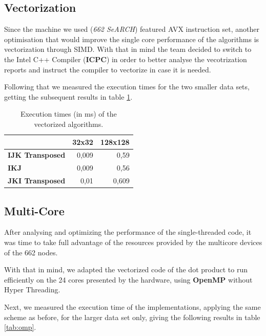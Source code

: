 \documentclass[twoside,twocolumn]{article}
\begin{document}
\subsection{Vectorization}

Since the machine we used (\textit{662 SeARCH}) featured AVX instruction set, another optimisation that would improve the single core performance of the algorithms is vectorization through SIMD. With that in mind the team decided to switch to the Intel C++ Compiler (\textbf{ICPC}) in order to better analyse the vecotrization reports and instruct the compiler to vectorize in case it is needed.

Following that we measured the execution times for the two smaller data sets, getting the subsequent results in table \ref{tab:vec}.

\begin{table}[ht]
\centering
\begin{tabular}{|l|r|r|}
\hline
                        & \multicolumn{1}{c|}{\textbf{32x32}} & \multicolumn{1}{c|}{\textbf{128x128}} \\ \hline
\textbf{IJK Transposed} & 0,009                               & 0,59                                  \\ \hline
\textbf{IKJ}            & 0,009                               & 0,56                                  \\ \hline
\textbf{JKI Transposed} & 0,01                                & 0,609                                 \\ \hline
\end{tabular}%
\caption{Execution times (in ms) of the vectorized algorithms.}
\label{tab:vec}
\end{table}

\subsection{Multi-Core}

After analysing and optimizing the performance of the single-threaded code, it was time to take full advantage of the resources provided by the multicore devices of the 662 nodes. 

With that in mind, we adapted the vectorized code of the dot product to run efficiently on the 24 cores presented by the hardware, using \textbf{OpenMP} without Hyper Threading.

Next, we measured the execution time of the implementations, applying the same scheme as before, for the larger data set only, giving the following results in table \ref{tab:omp}.
\end{document}
